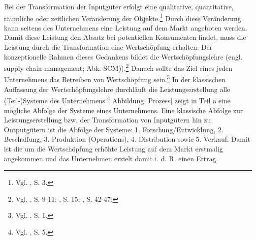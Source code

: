 Bei der Transformation der Inputgüter erfolgt eine qualitative, quantitative, räumliche oder zeitlichen Veränderung der Objekte.\footnote{Vgl. \cite{Dyckhoff2010}, S. 3.} Durch diese Veränderung kann seitens des Unternehmens eine Leistung auf dem Markt angeboten werden. Damit diese Leistung den Absatz bei potentiellen Konsumenten findet, muss die Leistung durch die Transformation eine Wertschöpfung erhalten. Der konzeptionelle Rahmen dieses Gedankens bildet die Wertschöpfungslehre (engl. supply chain management; Abk. SCM)).\footnote{Vgl. \cite{Stadtler:2005aa}, S. 9-11; \cite{christopher1998logistics}, S. 15; \cite{oliver1982supply}, S. 42-47.} Danach sollte das Ziel eines jeden Unternehmens das Betreiben von Wertschöpfung sein.\footnote{Vgl. \cite{Bach:2012aa}, S. 1.} In der klassischen Auffassung der Wertschöpfungslehre durchläuft die Leistungserstellung alle (Teil-)Systeme des Unternehmens.\footnote{Vgl. \cite{Werner:2013aa}, S. 5.} Abbildung \ref{Prozess} zeigt in Teil a eine mögliche Abfolge der Systeme eines Unternehmens. Eine klassische Abfolge zur Leistungserstellung bzw. der Transformation von Inputgütern hin zu Outputgütern ist die Abfolge der Systeme: 1. Forschung/Entwicklung, 2. Beschaffung, 3. Produktion (Operations), 4. Distribution sowie 5. Verkauf. Damit ist die um die Wertschöpfung erhöhte Leistung auf dem Markt erstmalig angekommen und das Unternehmen erzielt damit i. d. R. einen Ertrag.

